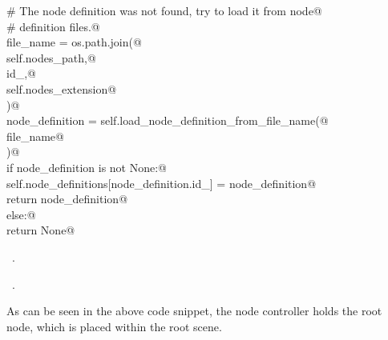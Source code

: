 \documentclass[
    a4paper,      %
    10pt,         %
    openright,    %
    notitlepage,  %
    parskip=half, %
]{scrreprt}       %
\theoremstyle{definition}                    %
\begin{document}
\begin{flushleft}
\begin{minipage}{\linewidth}
\begin{list}{}{}
\mbox{}\lstinline@        # The node definition was not found, try to load it from node@\\
\mbox{}\lstinline@        # definition files.@\\
\mbox{}\lstinline@        file_name = os.path.join(@\\
\mbox{}\lstinline@            self.nodes_path,@\\
\mbox{}\lstinline@            id_,@\\
\mbox{}\lstinline@            self.nodes_extension@\\
\mbox{}\lstinline@        )@\\
\mbox{}\lstinline@        node_definition = self.load_node_definition_from_file_name(@\\
\mbox{}\lstinline@            file_name@\\
\mbox{}\lstinline@        )@\\
\mbox{}\lstinline@        if node_definition is not None:@\\
\mbox{}\lstinline@            self.node_definitions[node_definition.id_] = node_definition@\\
\mbox{}\lstinline@            return node_definition@\\
\mbox{}\lstinline@        else:@\\
\mbox{}\lstinline@            return None@{\NWsep}
\end{list}
\vspace{-1.5ex}
\footnotesize
\begin{list}{}{\setlength{\itemsep}{-\parsep}\setlength{\itemindent}{-\leftmargin}}
\item \NWtxtMacroDefBy\ .
\item \NWtxtMacroRefIn\ .

\item{}
\end{list}
\end{minipage}\vspace{4ex}
\end{flushleft}
As can be seen in the above code snippet, the node controller holds the
root node, which is placed within the root scene.
\end{document}
